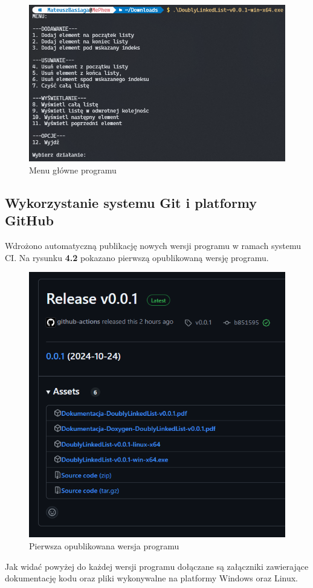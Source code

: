 \begin{figure}[!htb]
	\begin{center}
		\includegraphics[width=\textwidth]{rys/menu.png}
		\caption{Menu główne programu}\label{rys:menu_programu}
	\end{center}
\end{figure}

\subsection{Wykorzystanie systemu Git i platformy GitHub}

Wdrożono automatyczną publikację nowych wersji programu w ramach systemu CI.
Na rysunku \textbf{4.2} pokazano pierwszą opublikowaną wersję programu.

\begin{figure}[!htb]
	\begin{center}
		\includegraphics[width=\textwidth]{rys/ci-release.png}
		\caption{Pierwsza opublikowana wersja programu}\label{rys:ci_release}
	\end{center}
\end{figure}

Jak widać powyżej do każdej wersji programu dołączane są załączniki zawierające dokumentację kodu oraz
pliki wykonywalne na platformy Windows oraz Linux.
